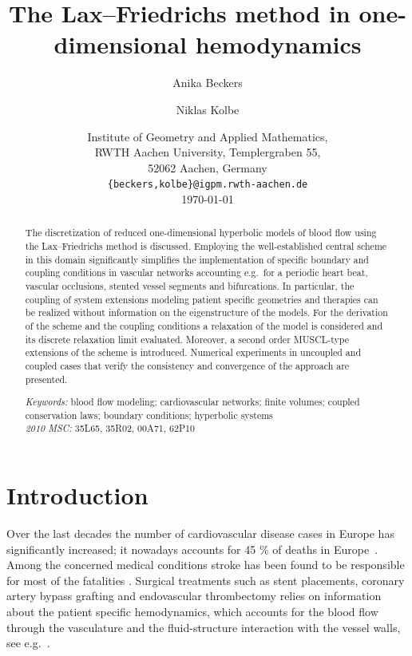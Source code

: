 \documentclass[a4paper,11pt]{article}
\providecommand{\keywords}[1]{\textit{Keywords:} #1}
\providecommand{\msc}[1]{\textit{2010 MSC:} #1}
\begin{document}
\date{
  \small
  Institute of Geometry and Applied Mathematics,\\ RWTH Aachen University, Templergraben 55,\\ 52062 Aachen, Germany\\
   \smallskip
   {\tt  \{beckers,kolbe\}@igpm.rwth-aachen.de} \\
   \smallskip
   \today
  }

\title{The Lax--Friedrichs method in one-dimensional hemodynamics}
\author{Anika Beckers \and Niklas Kolbe}

\maketitle

\begin{abstract}
  The discretization of reduced one-dimensional hyperbolic models of blood flow using the Lax--Friedrichs method is discussed. Employing the well-established central scheme in this domain significantly simplifies the implementation of specific boundary and coupling conditions in vascular networks accounting e.g.\ for a periodic heart beat, vascular occlusions, stented vessel segments and bifurcations. In particular, the coupling of system extensions modeling patient specific geometries and therapies can be realized without information on the eigenstructure of the models. For the derivation of the scheme and the coupling conditions a relaxation of the model is considered and its discrete relaxation limit evaluated. Moreover, a second order MUSCL-type extensions of the scheme is introduced. Numerical experiments in uncoupled and coupled cases that verify the consistency and convergence of the approach are presented.
  
  \bigskip
  \noindent \keywords{blood flow modeling; cardiovascular networks; finite volumes; coupled conservation laws; boundary conditions; hyperbolic systems}\\
  \msc{35L65, 35R02, 00A71, 62P10}
  \end{abstract}

  \section{Introduction}
  Over the last decades the number of cardiovascular disease cases in Europe has significantly increased; it nowadays accounts for 45 \% of deaths in Europe~\cite{wilkins2017europcardiovdiseasstatis}.
  Among the concerned medical conditions stroke has been found to be responsible for most of the fatalities \cite{saini2021globalepidemstrok}. Surgical treatments such as stent placements, coronary artery bypass grafting and endovascular thrombectomy relies on information about the patient specific hemodynamics, which accounts for the blood flow through the vasculature and the fluid-structure interaction with the vessel walls, see e.g.\ \cite{balossino2008effec,forti2019transopticmonit}.  
\end{document}
